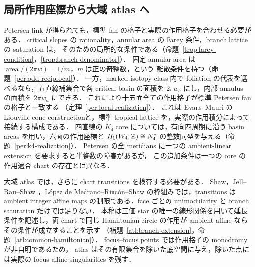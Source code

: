 \subsection{局所作用座標から大域 atlas へ}

Petersen link が得られても，標準 fan の格子と実際の作用格子を合わせる必要がある．
critical slopes の rationality，annular area の Farey 条件，branch lattice の saturation は，
そのための局所的な条件である（命題~\ref{trop:farey-condition}，\ref{trop:branch-denominator}）．
固定 annular area は $\operatorname{area}/(2\pi w)=1/m$，$m$ は正の奇整数，という
離散条件を持つ（命題~\ref{per:odd-reciprocal}）．
一方，marked isotopy class 内で foliation の代表を選べるなら，五直線補集合で各 critical
basin の面積を $2\pi w_b$ にし，内部 annulus の面積を $2\pi w_a$ にできる．
これにより十五面全ての作用格子が標準 Petersen fan の格子と一致する
（定理~\ref{per:local-realization}）．
これは Evans--Mauri の Liouville cone construction\cite{EM}と，標準 tropical lattice
\cite{GKM}を，実際の作用積分によって接続する構成である．
四直線の $K_4$ core については，有向四周期に沿う basin areas を用い，六面の作用座標と
$H_1(W_4;\mathbb Z)\cong N_4^*$ の整数同型を与える（命題~\ref{per:k4-realization}）．
Petersen の全 meridians に一つの ambient-linear extension を要求すると半整数の障害があるが，
この追加条件は一つの core の作用適合 chart の存在とは異なる．

大域 atlas では，さらに chart transitions を検査する必要がある．
Shaw\cite[Definition~3.1]{ShawSurfaces}，Jell--Rau--Shaw
\cite[Definitions~2.1, 3.1, 5.1]{JellRauShaw}，L\'opez de Medrano--Rinc\'on--Shaw
\cite[Definitions~2.2--2.4]{LRSChern}の枠組みでは，transitions は ambient integer affine maps
の制限である．face ごとの unimodularity と branch saturation だけでは足りない．
本稿は三価 star の唯一の線形関係を用いて延長条件を記述し，両 chart で同じ Hamiltonian
circle の作用が ambient-affine ならその条件が成立することを示す
（補題~\ref{atl:branch-extension}，命題~\ref{atl:common-hamiltonian}）．
focus--focus points では作用格子の monodromy が非自明である\cite[Remark~3.1]{VuNgoc}ため，
atlas はその有限集合を除いた底空間に与え，除いた点には実際の focus affine singularities を残す．


